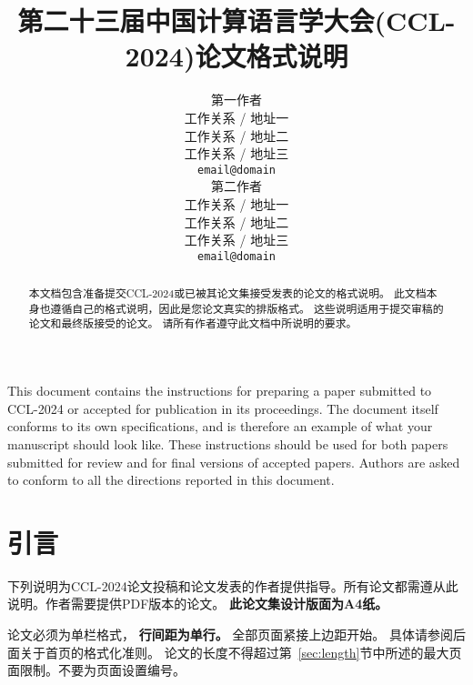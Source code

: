 \documentclass[11pt]{article}
\title{第二十三届中国计算语言学大会(CCL-2024)论文格式说明}
\author{第一作者 \\
  工作关系 / 地址一 \\
  工作关系 / 地址二 \\
  工作关系 / 地址三 \\
  {\tt email@domain} \\\And
  第二作者 \\
  工作关系 / 地址一 \\
  工作关系 / 地址二 \\
  工作关系 / 地址三 \\
  {\tt email@domain} \\}
\date{}
\begin{document}
\begin{CJK*}{UTF8}{gbsn}
\setlength{\parindent}{2em}

\maketitle
\begin{abstract}
  本文档包含准备提交CCL-2024或已被其论文集接受发表的论文的格式说明。
  此文档本身也遵循自己的格式说明，因此是您论文真实的排版格式。
  这些说明适用于提交审稿的论文和最终版接受的论文。
  请所有作者遵守此文档中所说明的要求。
\end{abstract}

\makeenglishtitle
\begin{englishabstract}
  This document contains the instructions for preparing a paper submitted
  to CCL-2024 or accepted for publication in its proceedings. The document itself
  conforms to its own specifications, and is therefore an example of
  what your manuscript should look like. These instructions should be
  used for both papers submitted for review and for final versions of
  accepted papers. Authors are asked to conform to all the directions
  reported in this document.
\end{englishabstract}


\section{引言}
\label{intro}

%
%

下列说明为CCL-2024论文投稿和论文发表的作者提供指导。所有论文都需遵从此说明。作者需要提供PDF版本的论文。 \textbf{此论文集设计版面为A4纸。}

论文必须为单栏格式， {\bf 行间距为单行。}
全部页面紧接上边距开始。
具体请参阅后面关于首页的格式化准则。
论文的长度不得超过第~\ref{sec:length}节中所述的最大页面限制。不要为页面设置编号。


\end{CJK*}
\end{document}

